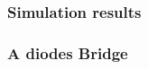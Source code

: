 \frame
{
  \frametitle{Simulation results}

}


\frame
{
\frametitle{A diodes Bridge}

\begin{figure}[h]
\centerline{
 \scalebox{0.3}{
    
 }
}\end{figure}
\begin {figure}[h]
 \scalebox{0.5}{

}
\end {figure} 

}

